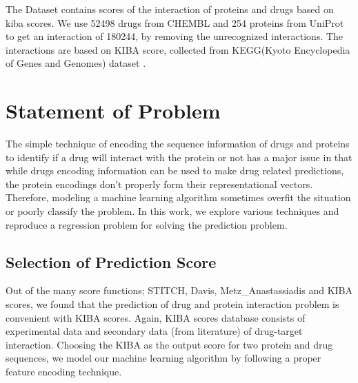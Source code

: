 \iffalse
(52498, 254)
180244
\fi
The Dataset contains scores of the interaction of proteins and drugs based on \acrshort{kiba} scores. We use 52498 drugs from CHEMBL and 254 proteins from UniProt to get an interaction of 180244, by removing the unrecognized interactions. The interactions are based on KIBA score, collected from KEGG(​Kyoto Encyclopedia of Genes and Genomes)​ dataset \cite{Kanehisa2000}.

\iffalse

For citations, use the function \textbackslash cite. \cite{gowar1989power} The references file is the sample.bib one. Google Scholar provides almost all the references in LaTeX form.

To insert a footnote, use the following command. \footnote{This is a footnote.} When necessary to use a nomenclature, define it on the same page for a better organization. Don't create NSN (Non-sense nomenclatures).

For figures, tables, equations and further information, open the file "tips.tex". If what you need is not found there, Google it.

\fi

\section{Statement of Problem}
The simple technique of encoding the sequence information of drugs and proteins to identify if a drug will interact with the protein or not has a major issue in that while drugs encoding information can be used to make drug related predictions, the protein encodings don't properly form their representational vectors. Therefore, modeling a machine learning algorithm sometimes overfit the situation or poorly classify the problem. In this work, we explore various techniques and reproduce a regression problem for solving the prediction problem.

\subsection{Selection of Prediction Score}

Out of the many score functions; STITCH, Davis, Metz\_Anastassiadis and KIBA scores, we found that the prediction of drug and protein interaction problem is convenient with KIBA scores. Again, KIBA scores database consists of experimental data and secondary data (from literature) of drug-target interaction. Choosing the KIBA as the output score for two protein and drug sequences, we model our machine learning algorithm by following a proper feature encoding technique.

